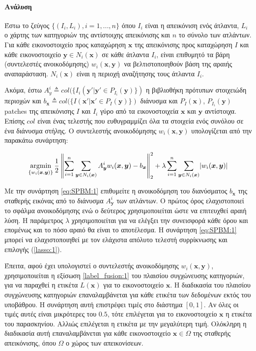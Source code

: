 \documentclass[a4paper,12pt]{article}
\newcommand{\paragraphLine}[1]{\paragraph{#1}\mbox{}}
\newcommand{\argminB}{\mathop{\mathrm{argmin}}}
\DeclarePairedDelimiter\abs{\lvert}{\rvert}
\newcommand\norm[1]{\left\lVert#1\right\rVert}
\begin{document}
\paragraphLine{Ανάλυση}

Έστω το ζεύγος $\{(I_i,L_i), i=1,...,n\}$ όπου $I_i$ είναι η
απεικόνιση ενός άτλαντα, $L_i$ ο χάρτης των κατηγοριών της αντίστοιχης
απεικόνισης και $n$ το σύνολο των ατλάντων. Για κάθε εικονοστοιχείο προς
καταχώρηση $\bm{x}$ της απεικόνισης προς καταχώρηση $I$ και κάθε εικονοστοιχείο
$\bm{y} \in N_i(\bm{x})$ σε κάθε άτλαντα $I_i$, είναι επιθυμητό τα βάρη
(συντελεστές ανοικοδόμησης) $w_i(\bm{x},\bm{y})$ να βελτιστοποιηθούν βάση της
αραιής αναπαράσταση. $N_i(\bm{x})$ είναι η περιοχή αναζήτησης τους άτλαντα
$I_i$.

Ακόμα, έστω $A^i_y \triangleq col(\{I_i(\bm{y'} | \bm{y'} \in
P_{I_i}(\bm{y})\})$ η βιβλιοθήκη πρότυπων στοιχειώδη περιοχών και $b_{\bm{x}}
\triangleq col( \{ I(\bm{x'} | \bm{x'} \in P_{I}(\bm{y})\})$ διάνυσμα και
$P_{I}(\bm{x})$, $P_{I_i}(\bm{y})$ patches της απεικόνισης $I$ και $I_i$ γύρο
από τα εικονοστοιχεία $\bm{x}$ και $\bm{y}$ αντίστοιχα. Επίσης $col$ είναι ένας
τελεστής που ευθυγραμμίζει όλα τα στοιχεία ενός συνόλου σε ένα διάνυσμα στήλης.
Ο συντελεστής ανοικοδόμησης $w_i(\bm{x},\bm{y})$ υπολογίζεται από την παρακάτω
συνάρτηση:

\begin{equation} \label{eq:SPBM:1}
    \argminB_{\{w_i(\bm{x},\bm{y})\}} { \frac{1} {2} \norm {\sum_{i=1}^{n}
    \sum_{\bm{y} \in N_i(\bm{x})} A_{\bm{y}}^i w_i(\bm{x},\bm{y}) -
    b_{\bm{x}}}_2^2 }
    + \lambda \sum_{i=1}^{n} \sum_{\bm{y} \in N_i(\bm{x})}
    \abs{w_i(\bm{x},\bm{y})}
\end{equation}

Με την συνάρτηση \eqref{eq:SPBM:1} επιθυμείτε η ανοικοδόμηση του διανύσματος
$b_{\bm{x}}$ της σταθερής εικόνας από το διάνυσμα $A^i_{\bm{y}}$ των ατλάντων. Ο
πρώτος όρος ελαχιστοποιεί το σφάλμα ανοικοδόμησης ενώ ο δεύτερος χρησιμοποιείται
ώστε να επιτευχθεί αραιή λύση. Η παράμετρος $\lambda$ χρησιμοποιείται για να
ελέγξει την συνεισφορά κάθε όρου και επομένως και το πόσο αραιό θα είναι το
αποτέλεσμα. Η συνάρτηση \eqref{eq:SPBM:1} μπορεί να ελαχιστοποιηθεί με τον
ελάχιστα απόλυτο τελεστή συρρίκνωσης και επιλογής (\ref{lasso:1}).

Έπειτα, αφού έχει υπολογιστεί ο συντελεστής ανοικοδόμησης $w_i(\bm{x},\bm{y})$, 
χρησιμοποιείται η εξίσωση \eqref{label_fusion:1} του πλαισίου συγχώνευσης
κατηγοριών, για να παραχθεί η ετικέτα $L(\bm{x})$ για το εικονοστοιχείο
$\bm{x}$.  Η διαδικασία του πλαισίου συγχώνευσης κατηγοριών επαναλαμβάνεται για
κάθε ετικέτα των δεδομένων εκτός του υποβάθρου. Η συνάρτηση αυτή επιστρέφει
τιμές στο διάστημα $[0,1]$. Αν όλες οι τιμές αυτές είναι μικρότερες του $0.5$,
τότε επιλέγεται για το εικονοστοιχείο $\bm{x}$ η ετικέτα του παρασκηνίου. Αλλιώς
επιλέγεται η ετικέτα με την μεγαλύτερη τιμή. Ολόκληρη η διαδικασία αυτή
επαναλαμβάνεται για κάθε εικονοστοιχείο $\bm{x} \in \Omega$ της σταθερής
απεικόνισης, όπου $\Omega$ ο χώρος των απεικονίσεων.
\end{document}
